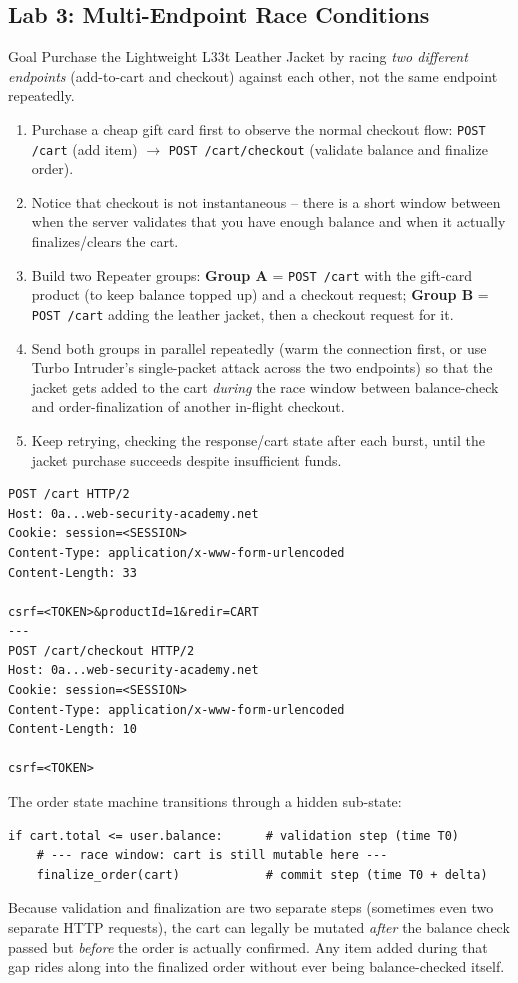 \documentclass[11pt]{article}
\begin{document}
\subsection{Lab 3: Multi-Endpoint Race Conditions}
\begin{labbox}{Goal}
Purchase the Lightweight L33t Leather Jacket by racing \emph{two different endpoints} (add-to-cart and checkout) against each other, not the same endpoint repeatedly.
\end{labbox}
\begin{enumerate}[leftmargin=1.2em]
  \item Purchase a cheap gift card first to observe the normal checkout flow: \texttt{POST /cart} (add item) $\rightarrow$ \texttt{POST /cart/checkout} (validate balance and finalize order).
  \item Notice that checkout is not instantaneous -- there is a short window between when the server validates that you have enough balance and when it actually finalizes/clears the cart.
  \item Build two Repeater groups: \textbf{Group A} = \texttt{POST /cart} with the gift-card product (to keep balance topped up) and a checkout request; \textbf{Group B} = \texttt{POST /cart} adding the leather jacket, then a checkout request for it.
  \item Send both groups in parallel repeatedly (warm the connection first, or use Turbo Intruder's single-packet attack across the two endpoints) so that the jacket gets added to the cart \emph{during} the race window between balance-check and order-finalization of another in-flight checkout.
  \item Keep retrying, checking the response/cart state after each burst, until the jacket purchase succeeds despite insufficient funds.
\end{enumerate}
\begin{lstlisting}[style=http]
POST /cart HTTP/2
Host: 0a...web-security-academy.net
Cookie: session=<SESSION>
Content-Type: application/x-www-form-urlencoded
Content-Length: 33

csrf=<TOKEN>&productId=1&redir=CART
---
POST /cart/checkout HTTP/2
Host: 0a...web-security-academy.net
Cookie: session=<SESSION>
Content-Type: application/x-www-form-urlencoded
Content-Length: 10

csrf=<TOKEN>
\end{lstlisting}
\begin{causebox}
The order state machine transitions through a hidden sub-state:
\begin{lstlisting}[style=code]
if cart.total <= user.balance:      # validation step (time T0)
    # --- race window: cart is still mutable here ---
    finalize_order(cart)            # commit step (time T0 + delta)
\end{lstlisting}
Because validation and finalization are two separate steps (sometimes even two separate HTTP requests), the cart can legally be mutated \emph{after} the balance check passed but \emph{before} the order is actually confirmed. Any item added during that gap rides along into the finalized order without ever being balance-checked itself.
\end{causebox}
\end{document}
